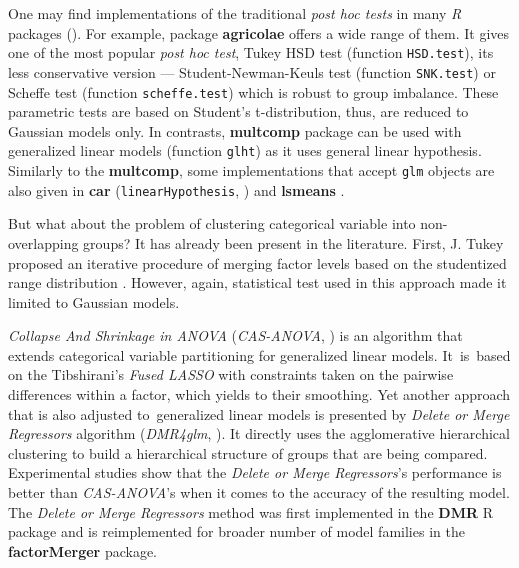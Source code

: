 \documentclass[12pt]{article}
\newcommand{\factorMerger}{\textbf{factorMerger }}
\newcommand{\code}{\texttt}
\begin{document}
One may find implementations of the traditional \emph{post hoc tests} in many \emph{R} packages (\cite{Rcran}). For example, package \textbf{agricolae} \citep{Agric} offers a wide range of them. It gives one of the most popular \emph{post hoc test}, Tukey HSD test (function \code{HSD.test}), its less conservative version --- Student-Newman-Keuls test (function \code{SNK.test}) or Scheffe test (function \code{scheffe.test}) which is robust to group imbalance. These parametric tests are based on Student's t-distribution, thus, are reduced to Gaussian models only. In contrasts, \textbf{multcomp} package \citep{Multcomp} can be used with generalized linear models (function \code{glht}) as it uses general linear hypothesis. Similarly to the \textbf{multcomp}, some implementations that accept \code{glm} objects are also given in \textbf{car} (\code{linearHypothesis}, \citealp{car}) and \textbf{lsmeans} \citep{lsmeans}.

But what about the problem of clustering categorical variable into non-overlapping groups? It has already been present in the literature. First, J. Tukey proposed an iterative procedure of merging factor levels based on the studentized range distribution \citep{Tukey}. However, again, statistical test used in this approach made it limited to Gaussian models.

\emph{Collapse And Shrinkage in ANOVA} (\emph{CAS-ANOVA}, \citealp{Casanova}) is an algorithm that extends categorical variable partitioning for generalized linear models. It~is~based on the Tibshirani's \emph{Fused LASSO} \citep{Tib} with constraints taken on the pairwise differences within a factor, which yields to their smoothing.
Yet another approach that is also adjusted to~generalized linear models is presented by \emph{Delete or Merge Regressors} algorithm (\emph{DMR4glm}, \citealp{Proch}). It directly uses the agglomerative hierarchical clustering \citep{clustering} to build a hierarchical structure of groups that are being compared. 
Experimental studies \citep{Proch} show that the \emph{Delete or Merge Regressors}'s performance is better than \emph{CAS-ANOVA}'s when it comes to the accuracy of the resulting model. The \emph{Delete or Merge Regressors} method was first implemented in the \textbf{DMR} R package \citep{DMR} and is reimplemented for broader number of model families in the \factorMerger package. 
\end{document}
